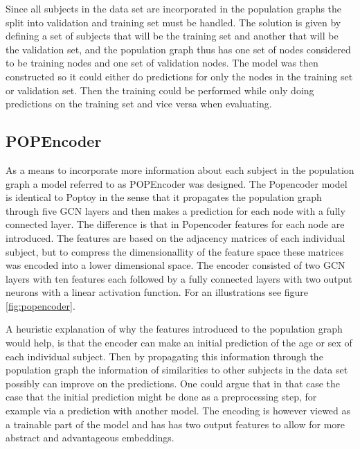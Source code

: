 Since all subjects in the data set are incorporated in the population graphs the split into validation and training set must be handled. The solution is given by defining a set of subjects that will be the training set and another that will be the validation set, and the population graph thus has one set of nodes considered to be training nodes and one set of validation nodes. The model was then constructed so it could either do predictions for only the nodes in the training set or validation set. Then the training could be performed while only doing predictions on the training set and vice versa when evaluating.

\subsection{POPEncoder}
As a means to incorporate more information about each subject in the population graph a model referred to as POPEncoder was designed. The Popencoder model is identical to Poptoy in the sense that it propagates the population graph through five GCN layers and then makes a prediction for each node with a fully connected layer. The difference is that in Popencoder features for each node are introduced. The features are based on the adjacency matrices of each individual subject, but to compress the dimensionallity of the feature space these matrices was encoded into a lower dimensional space. The encoder consisted of two GCN layers with ten features each followed by a fully connected layers with two output neurons with a linear activation function. For an illustrations see figure \ref{fig:popencoder}.

A heuristic explanation of why the features introduced to the population graph would help, is that the encoder can make an initial prediction of the age or sex of each individual subject. Then by propagating this information through the population graph the information of similarities to other subjects in the data set possibly can improve on the predictions. One could argue that in that case the case that the initial prediction might be done as a preprocessing step, for example via a prediction with another model. The encoding is however viewed as a trainable part of the model and has has two output features to allow for more abstract and advantageous embeddings. 



